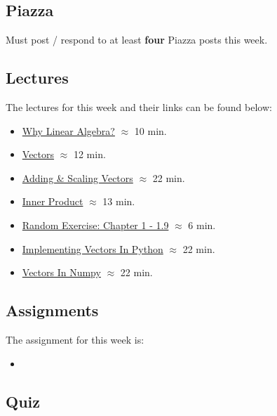 \subsection{Piazza}

Must post / respond to at least \textbf{four} Piazza posts this week.

\subsection{Lectures}

The lectures for this week and their links can be found below:

\begin{itemize}
    \item \href{https://applied.cs.colorado.edu/mod/hvp/view.php?id=50664}{Why Linear Algebra?} $\approx$ 10 min.
    \item \href{https://applied.cs.colorado.edu/mod/hvp/view.php?id=50666}{Vectors} $\approx$ 12 min.
    \item \href{https://applied.cs.colorado.edu/mod/hvp/view.php?id=50667}{Adding \& Scaling Vectors} $\approx$ 22 min.
    \item \href{https://applied.cs.colorado.edu/mod/hvp/view.php?id=50668}{Inner Product} $\approx$ 13 min.
    \item \href{https://applied.cs.colorado.edu/mod/hvp/view.php?id=50669}{Random Exercise: Chapter 1 - 1.9} $\approx$ 6 min.
    \item \href{https://applied.cs.colorado.edu/mod/hvp/view.php?id=50670}{Implementing Vectors In Python} $\approx$ 22 min.
    \item \href{https://applied.cs.colorado.edu/mod/hvp/view.php?id=50671}{Vectors In Numpy} $\approx$ 22 min.
\end{itemize}

\subsection{Assignments}

The assignment for this week is:

\begin{itemize}
    \item {}
\end{itemize}

\subsection{Quiz}

